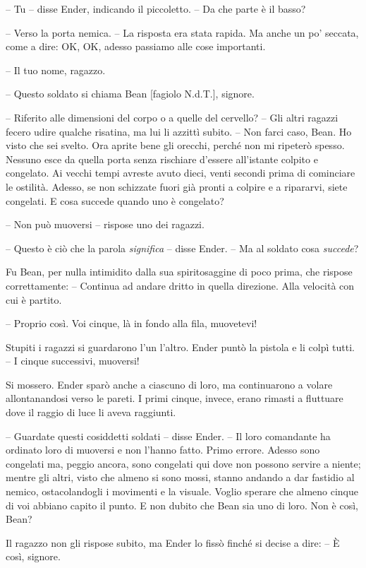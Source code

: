 {-- Tu -- disse Ender, indicando il piccoletto. -- Da che parte è il
	basso?}

{-- Verso la porta nemica. -- La risposta era stata rapida. Ma anche un
	po' seccata, come a dire: OK, OK, adesso passiamo alle cose importanti.}

{-- Il tuo nome, ragazzo.}

{-- Questo soldato si chiama Bean }{{[}fagiolo N.d.T.{]}}{, signore.}

{-- Riferito alle dimensioni del corpo o a quelle del cervello? -- Gli
	altri ragazzi fecero udire qualche risatina, ma lui li azzittì subito.
	-- Non farci caso, Bean. Ho visto che sei svelto. Ora aprite bene gli
	orecchi, perché non mi ripeterò spesso. Nessuno esce da quella porta
	senza rischiare d'essere all'istante colpito e congelato. Ai vecchi
	tempi avreste avuto dieci, venti secondi prima di cominciare le
	ostilità. Adesso, se non schizzate fuori già pronti a colpire e a
	ripararvi, siete congelati. E cosa succede quando uno è congelato?}

{-- Non può muoversi -- rispose uno dei ragazzi.}

{-- Questo è ciò che la parola \emph{significa} -- disse Ender. -- Ma al
	soldato cosa \emph{succede}?}

{Fu Bean, per nulla intimidito dalla sua spiritosaggine di poco prima,
	che rispose correttamente: -- Continua ad andare dritto in quella
	direzione. Alla velocità con cui è partito.}

{-- Proprio così. Voi cinque, là in fondo alla fila, muovetevi!}

{Stupiti i ragazzi si guardarono l'un l'altro. Ender puntò la pistola e
	li colpì tutti. -- I cinque successivi, muoversi!}

{Si mossero. Ender sparò anche a ciascuno di loro, ma continuarono a
	volare allontanandosi verso le pareti. I primi cinque, invece, erano
	rimasti a fluttuare dove il raggio di luce li aveva raggiunti.}

{-- Guardate questi cosiddetti soldati -- disse Ender. -- Il loro
	comandante ha ordinato loro di muoversi e non l'hanno fatto. Primo
	errore. Adesso sono congelati ma, peggio ancora, sono congelati qui dove
	non possono servire a niente; mentre gli altri, visto che almeno si sono
	mossi, stanno andando a dar fastidio al nemico, ostacolandogli i
	movimenti e la visuale. Voglio sperare che almeno cinque di voi abbiano
	capito il punto. E non dubito che Bean sia uno di loro. Non è così,
	Bean?}

{Il ragazzo non gli rispose subito, ma Ender lo fissò finché si decise a
	dire: -- È così, signore.}

